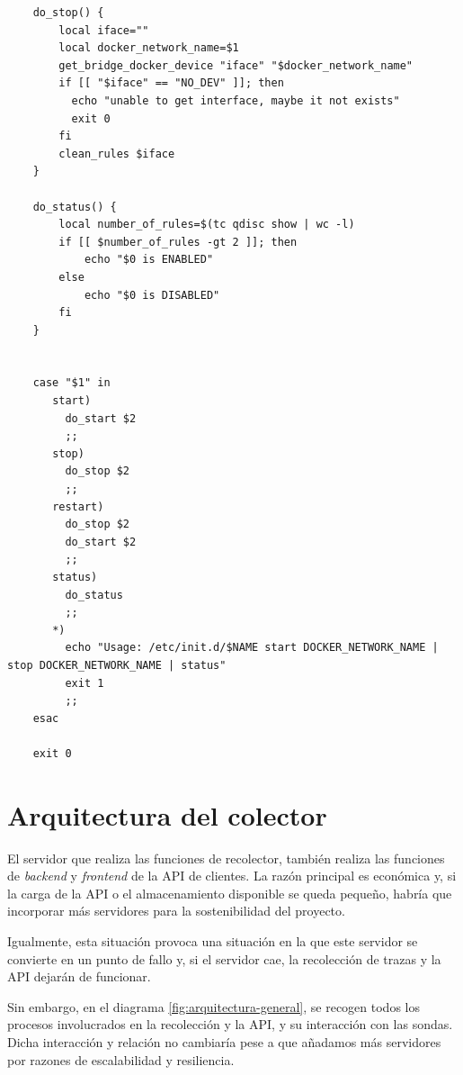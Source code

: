 \begin{verbatim}
    do_stop() {
        local iface=""
        local docker_network_name=$1
        get_bridge_docker_device "iface" "$docker_network_name"
        if [[ "$iface" == "NO_DEV" ]]; then
          echo "unable to get interface, maybe it not exists"
          exit 0
        fi
        clean_rules $iface
    }
    
    do_status() {
        local number_of_rules=$(tc qdisc show | wc -l)
        if [[ $number_of_rules -gt 2 ]]; then
            echo "$0 is ENABLED"
        else
            echo "$0 is DISABLED"
        fi
    }
    
    
    case "$1" in
       start)
         do_start $2
         ;;
       stop)
         do_stop $2
         ;;
       restart)
         do_stop $2
         do_start $2
         ;;
       status)
         do_status
         ;;
       *)
         echo "Usage: /etc/init.d/$NAME start DOCKER_NETWORK_NAME | stop DOCKER_NETWORK_NAME | status"
         exit 1
         ;;
    esac
    
    exit 0    
\end{verbatim}
\bigskip


\section{Arquitectura del colector}
\label{sec:arquitectura-del-colector}


El servidor que realiza las funciones de recolector, también realiza las funciones
de \emph{backend} y \emph{frontend} de la API de clientes. La razón principal
es económica y, si la carga de la API o el almacenamiento disponible se queda pequeño,
habría que incorporar más servidores para la sostenibilidad del proyecto.

Igualmente, esta situación provoca una situación en la que este servidor se convierte en un 
punto de fallo y, si el servidor cae, la recolección de trazas y la API dejarán de funcionar.

Sin embargo, en el diagrama \ref{fig:arquitectura-general}, se recogen todos los procesos involucrados
en la recolección y la API, y su interacción con las sondas. Dicha interacción y relación no cambiaría pese
a que añadamos más servidores por razones de escalabilidad y resiliencia.

